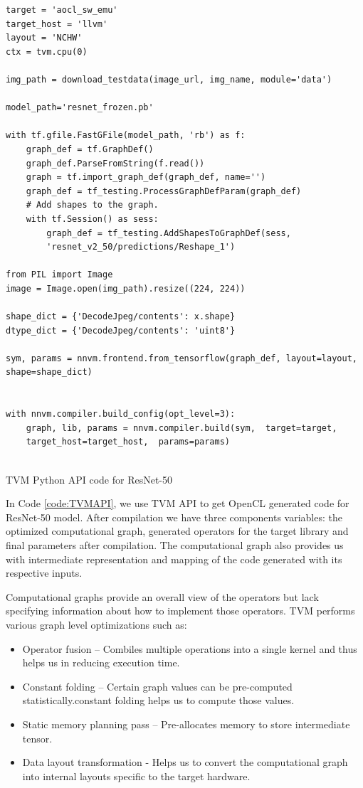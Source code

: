  \begin{code}[!htb]
 \begin{verbatim}
target = 'aocl_sw_emu'
target_host = 'llvm'
layout = 'NCHW'
ctx = tvm.cpu(0)

img_path = download_testdata(image_url, img_name, module='data')

model_path='resnet_frozen.pb'

with tf.gfile.FastGFile(model_path, 'rb') as f:
    graph_def = tf.GraphDef()
    graph_def.ParseFromString(f.read())
    graph = tf.import_graph_def(graph_def, name='')
    graph_def = tf_testing.ProcessGraphDefParam(graph_def)
    # Add shapes to the graph.
    with tf.Session() as sess:
        graph_def = tf_testing.AddShapesToGraphDef(sess,
        'resnet_v2_50/predictions/Reshape_1')   

from PIL import Image
image = Image.open(img_path).resize((224, 224))

shape_dict = {'DecodeJpeg/contents': x.shape}
dtype_dict = {'DecodeJpeg/contents': 'uint8'}

sym, params = nnvm.frontend.from_tensorflow(graph_def, layout=layout,
shape=shape_dict)


with nnvm.compiler.build_config(opt_level=3):
    graph, lib, params = nnvm.compiler.build(sym,  target=target,
    target_host=target_host,  params=params)


\end{verbatim}
\caption{TVM Python API code for ResNet-50}
\label{code:TVMAPI}
\end{code}


In Code \ref{code:TVMAPI}, we use TVM API to get OpenCL generated code for ResNet-50 model.
After compilation we have three components variables: the optimized computational graph, generated operators for the target library and final parameters after compilation. The computational graph also provides us with intermediate representation and mapping of the code generated with its respective inputs.

\pagebreak

Computational graphs provide an overall view of the operators but lack specifying information about how to implement those operators. TVM performs various graph level optimizations such as:
\begin{itemize}
 \item Operator fusion – Combiles multiple operations into a single kernel and thus helps us in reducing execution time.
 \item Constant folding – Certain graph values can be pre-computed statistically.constant folding helps us to compute those values.
 \item Static memory planning pass – Pre-allocates memory to store intermediate tensor.
 \item Data layout transformation - Helps us to convert the computational graph into internal layouts specific to the target hardware.

 \end{itemize}
 
